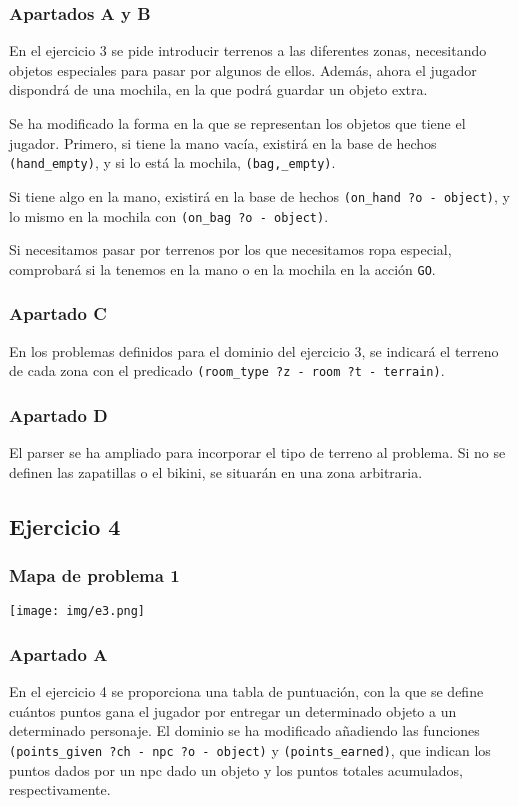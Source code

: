 \documentclass[11pt,a4paper]{article}
\begin{document}
\subsubsection{Apartados A y B}
En el ejercicio 3 se pide introducir terrenos a las diferentes zonas, necesitando objetos especiales para pasar por algunos de ellos. Además, ahora el jugador dispondrá de una mochila, en la que podrá guardar un objeto extra.


Se ha modificado la forma en la que se representan los objetos que tiene el jugador. Primero, si tiene la mano vacía, existirá en la 
base de hechos \texttt{(hand\_empty)}, y si lo está la mochila, \texttt{(bag,\_empty)}. 


Si tiene algo en la mano, existirá en la base de hechos \texttt{(on\_hand ?o - object)}, y lo mismo en la mochila con \texttt{(on\_bag ?o - object)}.


Si necesitamos pasar por terrenos por los que necesitamos ropa especial, comprobará si la tenemos en la mano o en la mochila en la acción \texttt{GO}.

\subsubsection{Apartado C}
En los problemas definidos para el dominio del ejercicio 3, se indicará el terreno de cada zona con el predicado \texttt{(room\_type ?z - room ?t - terrain)}.

\subsubsection{Apartado D}
El parser se ha ampliado para incorporar el tipo de terreno al problema. Si no se definen las zapatillas o el bikini, se situarán en una zona arbitraria.

\subsection{Ejercicio 4}
\subsubsection{Mapa de problema 1}
\texttt{[image: img/e3.png]}
\subsubsection{Apartado A}
En el ejercicio 4 se proporciona una tabla de puntuación, con la que se define cuántos puntos gana el jugador por entregar un
determinado objeto a un determinado personaje. El dominio se ha modificado añadiendo las funciones \texttt{(points\_given ?ch - npc ?o - object)} y \texttt{(points\_earned)}, que indican los puntos dados por un npc dado un objeto y los puntos totales acumulados, respectivamente.
\end{document}
